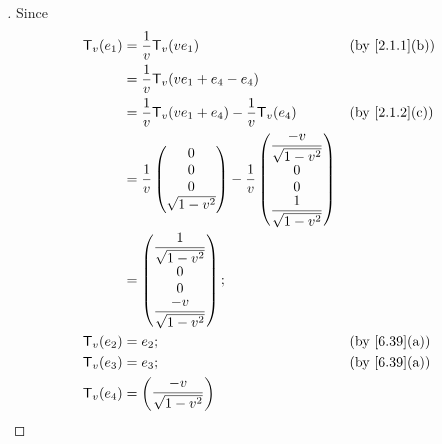 \begin{proof}[]
  Since
  \begin{align*}
    \T_v(e_1) & = \dfrac{1}{v} \T_v(v e_1)                                &  & \by{2.1.1}[b]    \\
              & = \dfrac{1}{v} \T_v(v e_1 + e_4 - e_4)                                          \\
              & = \dfrac{1}{v} \T_v(v e_1 + e_4) - \dfrac{1}{v} \T_v(e_4) &  & \by{2.1.2}[c]    \\
              & = \dfrac{1}{v} \begin{pmatrix}
                                 0 \\
                                 0 \\
                                 0 \\
                                 \sqrt{1 - v^2}
                               \end{pmatrix} - \dfrac{1}{v} \begin{pmatrix}
                                                              \dfrac{-v}{\sqrt{1 - v^2}} \\
                                                              0                          \\
                                                              0                          \\
                                                              \dfrac{1}{\sqrt{1 - v^2}}
                                                            \end{pmatrix} \\
              & = \begin{pmatrix}
                    \dfrac{1}{\sqrt{1 - v^2}} \\
                    0                         \\
                    0                         \\
                    \dfrac{-v}{\sqrt{1 - v^2}}
                  \end{pmatrix};                                            \\
    \T_v(e_2) & = e_2;                                                    &  & \by{6.39}[a]     \\
    \T_v(e_3) & = e_3;                                                    &  & \by{6.39}[a]     \\
    \T_v(e_4) & = \begin{pmatrix}
                    \dfrac{-v}{\sqrt{1 - v^2}} \\

\end{pmatrix}
\end{align*}
\end{proof}
